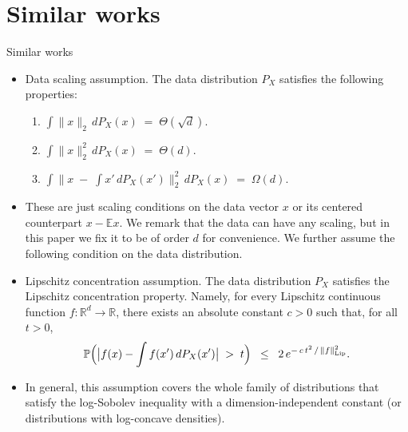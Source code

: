 \documentclass[serif, aspectratio=169]{beamer}
\begin{document}
\section{Similar works}



\begin{frame}{Similar works}
	\begin{itemize}
		\item Data scaling assumption.
		The data distribution $P_X$ satisfies the following properties:
		\begin{enumerate}
			\item $\displaystyle \int \|x\|_{2}\, dP_X(x) \;=\; \Theta(\sqrt{d}).$
			\item $\displaystyle \int \|x\|_{2}^{2}\, dP_X(x) \;=\; \Theta(d).$
			\item $\displaystyle \int \bigl\|x \;-\; \int x' \, dP_X(x')\bigr\|_{2}^{2}\, dP_X(x) 
			\;=\; \Omega(d).$
		\end{enumerate}
		\item These are just scaling conditions on the data vector $x$ or its centered 
		counterpart $x - \mathbb{E}x$. We remark that the data can have any scaling, 
		but in this paper we fix it to be of order $d$ for convenience. We further 
		assume the following condition on the data distribution.
		
		
	\end{itemize}
\end{frame}

\begin{frame}
	\begin{itemize}
		\item Lipschitz concentration assumption.
		The data distribution $P_X$ satisfies the Lipschitz concentration property. 
		Namely, for every Lipschitz continuous function 
		$f : \mathbb{R}^d \to \mathbb{R}$, there exists an absolute constant $c > 0$ 
		such that, for all $t > 0$,
		\[
		\mathbb{P}\Bigl(\bigl|f(x) - \int f(x')\,dP_X(x')\bigr| \;>\; t\Bigr)
		\;\;\le\;\; 2\,e^{-\,c\,t^2\,/\,\|f\|_{\mathrm{Lip}}^2}.
		\]
		\item In general, this assumption covers the whole family of distributions that satisfy 
		the log-Sobolev inequality with a dimension-independent constant (or distributions
		with log-concave densities).
	\end{itemize}
\end{frame}
\end{document}
